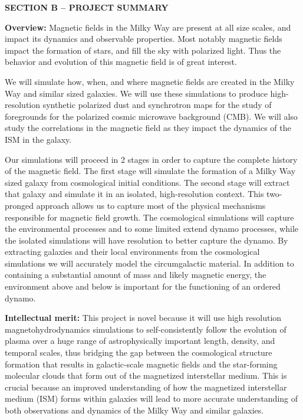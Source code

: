 \documentclass[11pt]{article}
\begin{document}
\vspace{-6mm}
\begin{center} 
\bfseries\uppercase{Section B -- Project Summary}
\end{center}
\vspace{-2mm}


\noindent \textbf{Overview:}
Magnetic fields in the Milky Way are present at all size scales, and impact its dynamics and observable properties.  Most notably magnetic fields impact the formation of stars, and fill the sky with polarized light.  Thus the behavior and evolution of this magnetic field is of great interest.

We will simulate how, when, and where magnetic fields are created in the Milky Way and similar sized galaxies.  We will use these simulations to produce high-resolution synthetic polarized dust and synchrotron maps for the study of foregrounds for the polarized cosmic microwave background (CMB). We will also study the correlations in the magnetic field as they impact the dynamics of the ISM in the galaxy.

Our simulations will proceed in 2 stages in order to capture the complete history of the magnetic field.  The first stage will simulate the formation of a Milky Way sized galaxy from cosmological initial conditions.  The second stage will extract that galaxy and simulate it in an isolated, high-resolution context.  This two-pronged approach allows us to capture most of the physical mechanisms responsible for magnetic field growth.   The cosmological simulations will capture the environmental processes and to some limited extend dynamo processes, while the isolated simulations will have resolution to better capture the dynamo.  By extracting galaxies and their local environments from the cosmological simulations we will accurately model the circumgalactic material. In addition to containing a substantial amount of mass and likely magnetic energy, the environment above and below is important for the functioning of an ordered dynamo.  

\textbf{Intellectual merit:} This project is novel because it will use high resolution magnetohydrodynamics simulations to self-consistently follow the evolution of plasma over a huge range of astrophysically important length, density, and temporal scales, thus bridging the gap between the cosmological structure formation that results in galactic-scale magnetic fields and the star-forming molecular clouds that form out of the magnetized interstellar medium.  This is crucial because an improved understanding of how the magnetized interstellar medium (ISM) forms within galaxies will lead to more accurate understanding of both observations and dynamics of the Milky Way and similar galaxies.
\end{document}
